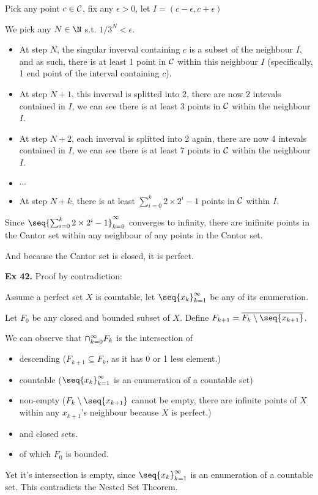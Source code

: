 Pick any point $c \in \mathcal{C}$, fix any $\epsilon > 0$, let $I = (c-\epsilon, c+\epsilon)$

We pick any $N\in \N$ s.t. $1/3^N < \epsilon$.

\begin{itemize}
    \item[] At step $N$, the singular inverval containing $c$ is a subset of the neighbour $I$, and as such, there is at least 1 point in $\mathcal{C}$ within this neighbour $I$ (specifically, 1 end point of the interval containing $c$).
    \item[] At step $N+1$, this inverval is splitted into 2, there are now 2 intevals contained in $I$, we can see there is at least 3 points in $\mathcal{C}$ within the neighbour $I$.
    \item[] At step $N+2$, each inverval is splitted into 2 again, there are now 4 intevals contained in $I$, we can see there is at least 7 points in $\mathcal{C}$ within the neighbour $I$.
    \item[] $\cdots$
    \item[] At step $N+k$, there is at least $\sum_{i=0}^{k} 2\times2^i - 1$ points in $\mathcal{C}$ within $I$.
\end{itemize}

Since $\seq{\sum_{i=0}^{k} 2\times2^i - 1}_{k=0}^{\infty}$ converges to infinity, there are inifinite points in the Cantor set within any neighbour of any points in the Cantor set.

And because the Cantor set is closed, it is perfect.


\noindent {}\textbf{Ex 42.} \label{ex:2_42}
Proof by contradiction:

Assume a perfect set $X$ is countable, let $\seq{x_k}_{k=1}^{\infty}$ be any of its enumeration.

Let $F_0$ be any closed and bounded subset of $X$. Define $F_{k+1} = \overline{F_k \setminus \seq{x_{k+1}}}$.

We can observe that $\cap_{k=0}^\infty F_k$ is the intersection of 
\begin{itemize}
    \item descending ($F_{k+1}\subseteq F_k$, as it has 0 or 1 less element.)
    \item countable ($\seq{x_k}_{k=1}^{\infty}$ is an enumeration of a countable set)
    \item non-empty ($F_k \setminus \seq{x_{k+1}}$ cannot be empty, there are infinite points of $X$ within any $x_{k+1}$'s neighbour because $X$ is perfect.)
    \item and closed sets.
    \item of which $F_0$ is bounded.
\end{itemize}
Yet it's intersection is empty, since $\seq{x_k}_{k=1}^{\infty}$ is an enumeration of a countable set. This contradicts the Nested Set Theorem.


